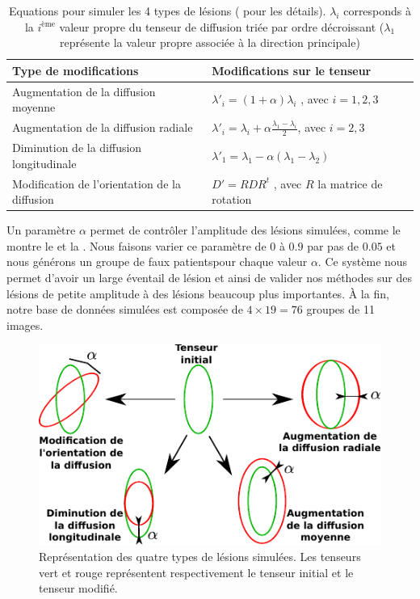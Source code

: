 \begin{table}[ht]
  \centering
  \begin{tabular}{|D{0.35\textwidth}|D{0.5\textwidth}|}
      \hline
      \textbf{Type de modifications} & \textbf{Modifications sur le tenseur} \tabularnewline
      \hline
      \hline
      Augmentation de la diffusion moyenne & $\lambda'_{i} = (1 + \alpha) \lambda_{i}$ , avec $i = {1,2,3}$ \tabularnewline
      Augmentation de la diffusion radiale & $\lambda'_{i} = \lambda_{i} + \alpha \frac{\lambda_{1} - \lambda_{i}}{2}$, avec $i = {2,3}$ \tabularnewline
      Diminution de la diffusion longitudinale & $\lambda'_{1} = \lambda_{1} - \alpha (\lambda_{1} - \lambda_{2})$ \tabularnewline
      Modification de l'orientation de la diffusion & $D' = R D R^{t}$ , avec $R$ la matrice de rotation \tabularnewline
      \hline
  \end{tabular}
  \caption{\label{tab:lesion} Equations pour simuler les 4 types de lésions (\cite{Boisgontier2012} pour les détails).
  $\lambda_{i}$ corresponds à la $i^{\text{ème}}$ valeur propre du tenseur de diffusion triée par ordre décroissant ($\lambda_{1}$ représente la valeur propre associée à la direction principale)} 
\end{table}

Un paramètre $\alpha$ permet de contrôler l'amplitude des lésions simulées, comme le montre le  et la .
Nous faisons varier ce paramètre de $0$ à $0.9$ par pas de $0.05$ 
et nous générons un groupe de \og faux patients\fg pour chaque valeur $\alpha$.
Ce système nous permet d'avoir un large éventail de lésion 
et ainsi de valider nos méthodes sur des lésions de petite amplitude à des lésions beaucoup plus importantes.
À la fin, notre base de données simulées est composée de $4\times19=76$ groupes de 11 images.

\begin{figure}[ht]
    \centering
    \includegraphics[scale=1.1]{Images/simulation_new.pdf}
    \caption{\label{fig:lesion}Représentation des quatre types de lésions simulées. Les tenseurs vert et rouge représentent respectivement le tenseur initial et le tenseur modifié.}
\end{figure}


